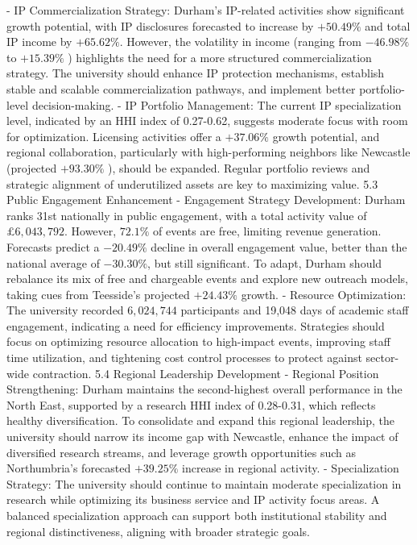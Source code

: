 - IP Commercialization Strategy: Durham's IP-related activities show significant growth potential, with IP disclosures forecasted to increase by $+50.49 \%$ and total IP income by $+65.62 \%$. However, the volatility in income (ranging from $-46.98 \%$ to $+15.39 \%$ ) highlights the need for a more structured commercialization strategy. The university should enhance IP protection mechanisms, establish stable and scalable commercialization pathways, and implement better portfolio-level decision-making.
- IP Portfolio Management: The current IP specialization level, indicated by an HHI index of 0.27-0.62, suggests moderate focus with room for optimization. Licensing activities offer a $+37.06 \%$ growth potential, and regional collaboration, particularly with high-performing neighbors like Newcastle (projected $+93.30 \%$ ), should be expanded. Regular portfolio reviews and strategic alignment of underutilized assets are key to maximizing value.
5.3 Public Engagement Enhancement
- Engagement Strategy Development: Durham ranks 31st nationally in public engagement, with a total activity value of $£ 6,043,792$. However, $72.1 \%$ of events are free, limiting revenue generation. Forecasts predict a $-20.49 \%$ decline in overall engagement value, better than the national average of $-30.30 \%$, but still significant. To adapt, Durham should rebalance its mix of free and chargeable events and explore new outreach models, taking cues from Teesside's projected $+24.43 \%$ growth.
- Resource Optimization: The university recorded $6,024,744$ participants and 19,048 days of academic staff engagement, indicating a need for efficiency improvements. Strategies should focus on optimizing resource allocation to high-impact events, improving staff time utilization, and tightening cost control processes to protect against sector-wide contraction.
5.4 Regional Leadership Development
- Regional Position Strengthening: Durham maintains the second-highest overall performance in the North East, supported by a research HHI index of 0.28-0.31, which reflects healthy diversification. To consolidate and expand this regional leadership, the university should narrow its income gap with Newcastle, enhance the impact of diversified research streams, and leverage growth opportunities such as Northumbria's forecasted $+39.25 \%$ increase in regional activity.
- Specialization Strategy: The university should continue to maintain moderate specialization in research while optimizing its business service and IP activity focus areas. A balanced specialization approach can support both institutional stability and regional distinctiveness, aligning with broader strategic goals.
